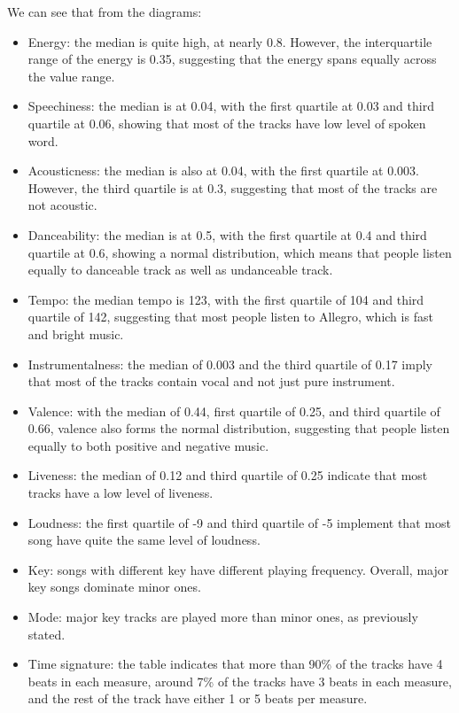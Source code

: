 \noindent We can see that from the diagrams:
\begin{itemize}
	\item Energy: the median is quite high, at nearly 0.8. However, the interquartile range of the energy is 0.35, suggesting that the energy spans equally across the value range.
	\item Speechiness: the median is at 0.04, with the first quartile at 0.03 and third quartile at 0.06, showing that most of the tracks have low level of spoken word. 
	\item Acousticness: the median is also at 0.04, with the first quartile at 0.003. However, the third quartile is at 0.3, suggesting that most of the tracks are not acoustic.
	\item Danceability: the median is at 0.5, with the first quartile at 0.4 and third quartile at 0.6, showing a normal distribution, which means that people listen equally to danceable track as well as undanceable track.
	\item Tempo: the median tempo is 123, with the first quartile of 104 and third quartile of 142, suggesting that most people listen to Allegro, which is fast and bright music.
	\item Instrumentalness: the median of 0.003 and the third quartile of 0.17 imply that most of the tracks contain vocal and not just pure instrument.
	\item Valence: with the median of 0.44, first quartile of 0.25, and third quartile of 0.66, valence also forms the normal distribution, suggesting that people listen equally to both positive and negative music.
	\item Liveness: the median of 0.12 and third quartile of 0.25 indicate that most tracks have a low level of liveness.
	\item Loudness: the first quartile of -9 and third quartile of -5 implement that most song have quite the same level of loudness.
	\item Key: songs with different key have different playing frequency. Overall, major key songs dominate minor ones.
	\item Mode: major key tracks are played more than minor ones, as previously stated.
	\item Time signature: the table indicates that more than 90\% of the tracks have 4 beats in each measure, around 7\% of the tracks have 3 beats in each measure, and the rest of the track have either 1 or 5 beats per measure.
\end{itemize}
	
